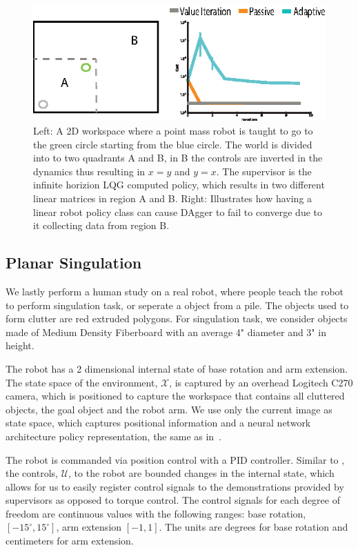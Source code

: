 \documentclass[10pt, conference]{ieeeconf}      %
\begin{document}
\begin{figure}
\centering
\includegraphics{f_figs/p_mass.eps}
\caption{
    \footnotesize
Left: A 2D workspace where a point mass robot is taught to go to the green circle starting from the blue circle. The world is divided into to two quadrants A and B, in B the controls are inverted in the dynamics thus resulting in $x=y$ and $y=x$. The supervisor is the infinite horizion LQG computed policy, which results in two different linear matrices in region A and B. Right: Illustrates how having a linear robot policy class can cause DAgger to fail  to converge due to it collecting data from region B.  }
\vspace*{-20pt}
\label{fig:p_mass}
\end{figure}

\subsection{Planar Singulation}
We lastly perform a human study on a real robot, where people teach the robot to perform singulation task, or seperate a object from a pile. The objects used to form clutter are red extruded polygons.  For singulation task, we consider objects made of Medium Density Fiberboard with an average 4" diameter and 3" in height. 

The robot has a 2 dimensional internal state of base rotation and arm extension. The state space of the environment, $\mathcal{X}$, is captured by  an overhead Logitech C270 camera, which is positioned to capture the workspace that contains all cluttered objects, the goal object and the robot arm. We use only the current image as state space, which captures positional information and a neural network architecture policy representation, the same as in~\cite{laskeyrobot}.

The robot is commanded via position 
control with a  PID controller. Similar to \cite{laskeyshiv}, the controls, $\mathcal{U}$, to the robot are bounded changes in the internal state, which allows for us to easily register control signals to the demonstrations provided by supervisors as opposed to torque control. The control signals for each degree of freedom are continuous values with the following ranges: base rotation, $[-15^\circ,15^\circ]$, arm extension $[-1,1]$. The units are degrees for base rotation and centimeters for arm extension. 
\end{document}

